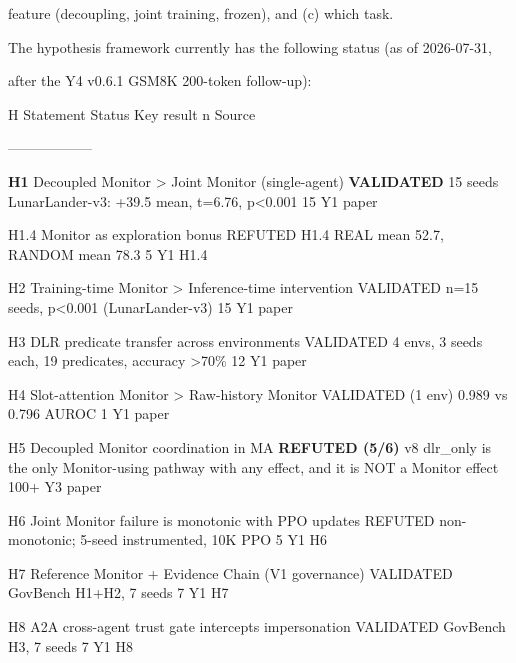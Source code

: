 \documentclass[11pt]{article}
\begin{document}
feature (decoupling, joint training, frozen), and (c) which task.

The hypothesis framework currently has the following status (as of
2026-07-31,

after the Y4 v0.6.1 GSM8K 200-token follow-up):

H \textbar{} Statement \textbar{} Status \textbar{} Key result
\textbar{} n \textbar{} Source \textbar{}

\textbar---\textbar---\textbar---\textbar---\textbar---\textbar---\textbar{}

\textbf{H1} \textbar{} Decoupled Monitor \textgreater{} Joint Monitor
(single-agent) \textbar{} \textbf{VALIDATED} \textbar{} 15 seeds
LunarLander-v3: +39.5 mean, t=6.76, p\textless0.001 \textbar{} 15
\textbar{} Y1 paper \textbar{}

H1.4 \textbar{} Monitor as exploration bonus \textbar{} REFUTED
\textbar{} H1.4 REAL mean 52.7, RANDOM mean 78.3 \textbar{} 5 \textbar{}
Y1 H1.4 \textbar{}

H2 \textbar{} Training-time Monitor \textgreater{} Inference-time
intervention \textbar{} VALIDATED \textbar{} n=15 seeds, p\textless0.001
(LunarLander-v3) \textbar{} 15 \textbar{} Y1 paper \textbar{}

H3 \textbar{} DLR predicate transfer across environments \textbar{}
VALIDATED \textbar{} 4 envs, 3 seeds each, 19 predicates, accuracy
\textgreater70\% \textbar{} 12 \textbar{} Y1 paper \textbar{}

H4 \textbar{} Slot-attention Monitor \textgreater{} Raw-history Monitor
\textbar{} VALIDATED (1 env) \textbar{} 0.989 vs 0.796 AUROC \textbar{}
1 \textbar{} Y1 paper \textbar{}

H5 \textbar{} Decoupled Monitor coordination in MA \textbar{}
\textbf{REFUTED (5/6)} \textbar{} v8 dlr\_only is the only Monitor-using
pathway with any effect, and it is NOT a Monitor effect \textbar{} 100+
\textbar{} Y3 paper \textbar{}

H6 \textbar{} Joint Monitor failure is monotonic with PPO updates
\textbar{} REFUTED \textbar{} non-monotonic; 5-seed instrumented, 10K
PPO \textbar{} 5 \textbar{} Y1 H6 \textbar{}

H7 \textbar{} Reference Monitor + Evidence Chain (V1 governance)
\textbar{} VALIDATED \textbar{} GovBench H1+H2, 7 seeds \textbar{} 7
\textbar{} Y1 H7 \textbar{}

H8 \textbar{} A2A cross-agent trust gate intercepts impersonation
\textbar{} VALIDATED \textbar{} GovBench H3, 7 seeds \textbar{} 7
\textbar{} Y1 H8 \textbar{}
\end{document}
